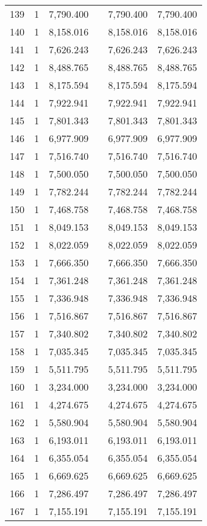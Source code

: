 \begin{table}[!htbp]
\begin{tabular}{@{\extracolsep{5pt}}lccccc}
139 & 1 & 7,790.400 &  & 7,790.400 & 7,790.400 \\ 
140 & 1 & 8,158.016 &  & 8,158.016 & 8,158.016 \\ 
141 & 1 & 7,626.243 &  & 7,626.243 & 7,626.243 \\ 
142 & 1 & 8,488.765 &  & 8,488.765 & 8,488.765 \\ 
143 & 1 & 8,175.594 &  & 8,175.594 & 8,175.594 \\ 
144 & 1 & 7,922.941 &  & 7,922.941 & 7,922.941 \\ 
145 & 1 & 7,801.343 &  & 7,801.343 & 7,801.343 \\ 
146 & 1 & 6,977.909 &  & 6,977.909 & 6,977.909 \\ 
147 & 1 & 7,516.740 &  & 7,516.740 & 7,516.740 \\ 
148 & 1 & 7,500.050 &  & 7,500.050 & 7,500.050 \\ 
149 & 1 & 7,782.244 &  & 7,782.244 & 7,782.244 \\ 
150 & 1 & 7,468.758 &  & 7,468.758 & 7,468.758 \\ 
151 & 1 & 8,049.153 &  & 8,049.153 & 8,049.153 \\ 
152 & 1 & 8,022.059 &  & 8,022.059 & 8,022.059 \\ 
153 & 1 & 7,666.350 &  & 7,666.350 & 7,666.350 \\ 
154 & 1 & 7,361.248 &  & 7,361.248 & 7,361.248 \\ 
155 & 1 & 7,336.948 &  & 7,336.948 & 7,336.948 \\ 
156 & 1 & 7,516.867 &  & 7,516.867 & 7,516.867 \\ 
157 & 1 & 7,340.802 &  & 7,340.802 & 7,340.802 \\ 
158 & 1 & 7,035.345 &  & 7,035.345 & 7,035.345 \\ 
159 & 1 & 5,511.795 &  & 5,511.795 & 5,511.795 \\ 
160 & 1 & 3,234.000 &  & 3,234.000 & 3,234.000 \\ 
161 & 1 & 4,274.675 &  & 4,274.675 & 4,274.675 \\ 
162 & 1 & 5,580.904 &  & 5,580.904 & 5,580.904 \\ 
163 & 1 & 6,193.011 &  & 6,193.011 & 6,193.011 \\ 
164 & 1 & 6,355.054 &  & 6,355.054 & 6,355.054 \\ 
165 & 1 & 6,669.625 &  & 6,669.625 & 6,669.625 \\ 
166 & 1 & 7,286.497 &  & 7,286.497 & 7,286.497 \\ 
167 & 1 & 7,155.191 &  & 7,155.191 & 7,155.191 \\ 

\end{tabular}
\end{table}

